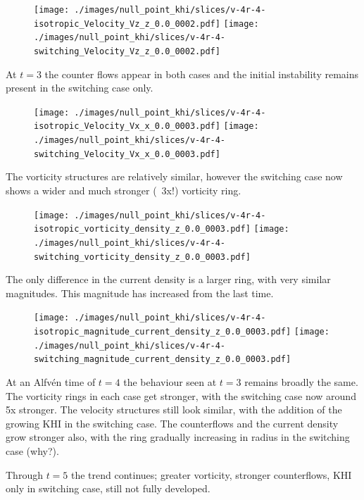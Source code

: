 \begin{figure}[H]
  \centering
  \texttt{[image: ./images/null\_point\_khi/slices/v-4r-4-isotropic\_Velocity\_Vz\_z\_0.0\_0002.pdf]}
  \texttt{[image: ./images/null\_point\_khi/slices/v-4r-4-switching\_Velocity\_Vz\_z\_0.0\_0002.pdf]}
\end{figure}

At $t=3$ the counter flows appear in both cases and the initial instability remains present in the switching case only.

\begin{figure}[H]
  \centering
  \texttt{[image: ./images/null\_point\_khi/slices/v-4r-4-isotropic\_Velocity\_Vx\_x\_0.0\_0003.pdf]}
  \texttt{[image: ./images/null\_point\_khi/slices/v-4r-4-switching\_Velocity\_Vx\_x\_0.0\_0003.pdf]}
\end{figure}

The vorticity structures are relatively similar, however the switching case now shows a wider and much stronger (~3x!) vorticity ring.

\begin{figure}[H]
  \centering
  \texttt{[image: ./images/null\_point\_khi/slices/v-4r-4-isotropic\_vorticity\_density\_z\_0.0\_0003.pdf]}
  \texttt{[image: ./images/null\_point\_khi/slices/v-4r-4-switching\_vorticity\_density\_z\_0.0\_0003.pdf]}
\end{figure}

The only difference in the current density is a larger ring, with very similar magnitudes. This magnitude has increased from the last time.

\begin{figure}[H]
  \centering
  \texttt{[image: ./images/null\_point\_khi/slices/v-4r-4-isotropic\_magnitude\_current\_density\_z\_0.0\_0003.pdf]}
  \texttt{[image: ./images/null\_point\_khi/slices/v-4r-4-switching\_magnitude\_current\_density\_z\_0.0\_0003.pdf]}
\end{figure}

At an Alfv\'en time of $t=4$ the behaviour seen at $t=3$ remains  broadly the same. The vorticity rings in each case get stronger, with the switching case now around 5x stronger. The velocity structures still look similar, with the addition of the growing KHI in the switching case. The counterflows and the current density grow stronger also, with the ring gradually increasing in radius in the switching case (why?).

Through $t=5$ the trend continues; greater vorticity, stronger counterflows, KHI only in switching case, still not fully developed.

